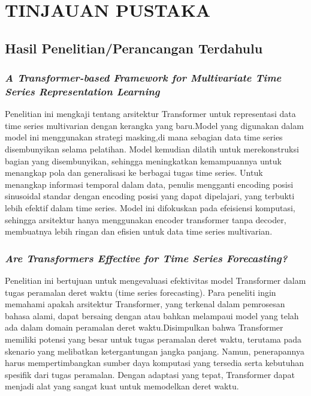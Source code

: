 \chapter{TINJAUAN PUSTAKA}



\section{Hasil Penelitian/Perancangan Terdahulu}

\subsection{\textit{A Transformer-based Framework for Multivariate Time Series Representation Learning}}
 Penelitian ini mengkaji tentang arsitektur Transformer untuk representasi data time series multivarian dengan kerangka yang baru.Model yang digunakan dalam model ini menggunakan strategi masking,di mana sebagian data time series disembunyikan selama pelatihan. Model kemudian dilatih untuk merekonstruksi bagian yang disembunyikan, sehingga meningkatkan kemampuannya untuk menangkap pola dan generalisasi ke berbagai tugas time series. Untuk menangkap informasi temporal dalam data, penulis mengganti encoding posisi sinusoidal standar dengan encoding posisi yang dapat dipelajari, yang terbukti lebih efektif dalam time series. Model ini difokuskan pada efeisiensi komputasi, sehingga arsitektur hanya menggunakan encoder transformer tanpa decoder, membuatnya lebih ringan dan efisien untuk data time series multivarian.
 
\subsection{\textit{Are Transformers Effective for Time Series Forecasting?}}
 Penelitian ini bertujuan untuk mengevaluasi efektivitas model Transformer dalam tugas peramalan deret waktu (time series forecasting). Para peneliti ingin memahami apakah arsitektur Transformer, yang terkenal dalam pemrosesan bahasa alami, dapat bersaing dengan atau bahkan melampaui model yang telah ada dalam domain peramalan deret waktu.Disimpulkan bahwa Transformer memiliki potensi yang besar untuk tugas peramalan deret waktu, terutama pada skenario yang melibatkan ketergantungan jangka panjang. Namun, penerapannya harus mempertimbangkan sumber daya komputasi yang tersedia serta kebutuhan spesifik dari tugas peramalan. Dengan adaptasi yang tepat, Transformer dapat menjadi alat yang sangat kuat untuk memodelkan deret waktu.

